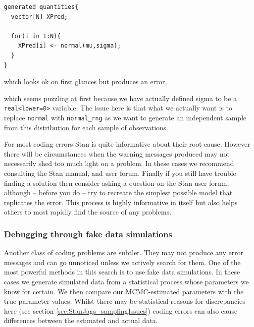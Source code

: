 \documentclass[11pt,fullpage]{book}
\makeatletter
\newenvironment{kframe}{%
	\def\at@end@of@kframe{}%
	\ifinner\ifhmode%
	\def\at@end@of@kframe{\end{minipage}}%
\begin{minipage}{\columnwidth}%
	\fi\fi%
	\def\FrameCommand##1{\hskip\@totalleftmargin \hskip-\fboxsep
		\colorbox{shadecolor}{##1}\hskip-\fboxsep
		\hskip-\linewidth \hskip-\@totalleftmargin \hskip\columnwidth}%
	\MakeFramed {\advance\hsize-\width
		\@totalleftmargin\z@ \linewidth\hsize
		\@setminipage}}%
{\par\unskip\endMakeFramed%
	\at@end@of@kframe}
\newenvironment{knitrout}{}{} %
\makeatother
\begin{document}
\begin{verbatim}
generated quantities{
  vector[N] XPred;
  
  for(i in 1:N){
    XPred[i] <- normal(mu,sigma);
  }
}
\end{verbatim}

which looks ok on first glances but produces an error,

\begin{knitrout}\small
		\color{fgcolor}\begin{kframe}

{\ttfamily\noindent\itshape\color{messagecolor}{\#\# SYNTAX ERROR, MESSAGE(S) FROM PARSER:}}

{\ttfamily\noindent\itshape\color{messagecolor}{\#\# }}

{\ttfamily\noindent\itshape\color{messagecolor}{\#\# No matches for:}}

{\ttfamily\noindent\itshape\color{messagecolor}{\#\#\ \  normal(real, real)}}

{\ttfamily\noindent\itshape\color{messagecolor}{\#\# Function normal not found.}}

		\end{kframe}
	\end{knitrout}
	

which seems puzzling at first because we have actually defined sigma to be a \texttt{real<lower=0>} variable. The issue here is that what we actually want is to replace \texttt{normal} with \texttt{normal_rng} as we want to generate an independent sample from this distribution for each sample of observations. 

For most coding errors Stan is quite informative about their root cause. However there will be circumstances when the warning messages produced may not necessarily shed too much light on a problem. In these cases we recommend consulting the Stan manual, and user forum. Finally if you still have trouble finding a solution then consider asking a question on the Stan user forum, although -- before you do -- try to recreate the simplest possible model that replicates the error. This process is highly informative in itself but also helps others to most rapidly find the source of any problems.

\subsubsection{Debugging through fake data simulations}
Another class of coding problems are subtler. They may not produce any error messages and can go unnoticed unless we actively search for them. One of the most powerful methods in this search is to use fake data simulations. In these cases we generate simulated data from a statistical process whose parameters we know for certain. We then compare our MCMC-estimated parameters with the true parameter values. Whilst there may be statistical reasons for discrepancies here (see section \ref{sec:StanJags_samplingIssues}) coding errors can also cause differences between the estimated and actual data.
\end{document}
